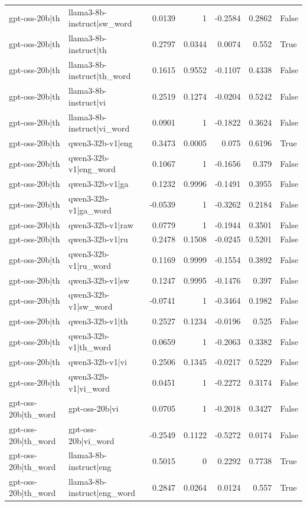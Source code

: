 \begin{table}
\begin{tabular}{l l r r r r l}
gpt-oss-20b|th & llama3-8b-instruct|sw_word & 0.0139 & 1 & -0.2584 & 0.2862 & False \\
gpt-oss-20b|th & llama3-8b-instruct|th & 0.2797 & 0.0344 & 0.0074 & 0.552 & True \\
gpt-oss-20b|th & llama3-8b-instruct|th_word & 0.1615 & 0.9552 & -0.1107 & 0.4338 & False \\
gpt-oss-20b|th & llama3-8b-instruct|vi & 0.2519 & 0.1274 & -0.0204 & 0.5242 & False \\
gpt-oss-20b|th & llama3-8b-instruct|vi_word & 0.0901 & 1 & -0.1822 & 0.3624 & False \\
gpt-oss-20b|th & qwen3-32b-v1|eng & 0.3473 & 0.0005 & 0.075 & 0.6196 & True \\
gpt-oss-20b|th & qwen3-32b-v1|eng_word & 0.1067 & 1 & -0.1656 & 0.379 & False \\
gpt-oss-20b|th & qwen3-32b-v1|ga & 0.1232 & 0.9996 & -0.1491 & 0.3955 & False \\
gpt-oss-20b|th & qwen3-32b-v1|ga_word & -0.0539 & 1 & -0.3262 & 0.2184 & False \\
gpt-oss-20b|th & qwen3-32b-v1|raw & 0.0779 & 1 & -0.1944 & 0.3501 & False \\
gpt-oss-20b|th & qwen3-32b-v1|ru & 0.2478 & 0.1508 & -0.0245 & 0.5201 & False \\
gpt-oss-20b|th & qwen3-32b-v1|ru_word & 0.1169 & 0.9999 & -0.1554 & 0.3892 & False \\
gpt-oss-20b|th & qwen3-32b-v1|sw & 0.1247 & 0.9995 & -0.1476 & 0.397 & False \\
gpt-oss-20b|th & qwen3-32b-v1|sw_word & -0.0741 & 1 & -0.3464 & 0.1982 & False \\
gpt-oss-20b|th & qwen3-32b-v1|th & 0.2527 & 0.1234 & -0.0196 & 0.525 & False \\
gpt-oss-20b|th & qwen3-32b-v1|th_word & 0.0659 & 1 & -0.2063 & 0.3382 & False \\
gpt-oss-20b|th & qwen3-32b-v1|vi & 0.2506 & 0.1345 & -0.0217 & 0.5229 & False \\
gpt-oss-20b|th & qwen3-32b-v1|vi_word & 0.0451 & 1 & -0.2272 & 0.3174 & False \\
gpt-oss-20b|th_word & gpt-oss-20b|vi & 0.0705 & 1 & -0.2018 & 0.3427 & False \\
gpt-oss-20b|th_word & gpt-oss-20b|vi_word & -0.2549 & 0.1122 & -0.5272 & 0.0174 & False \\
gpt-oss-20b|th_word & llama3-8b-instruct|eng & 0.5015 & 0 & 0.2292 & 0.7738 & True \\
gpt-oss-20b|th_word & llama3-8b-instruct|eng_word & 0.2847 & 0.0264 & 0.0124 & 0.557 & True \\

\end{tabular}
\end{table}
